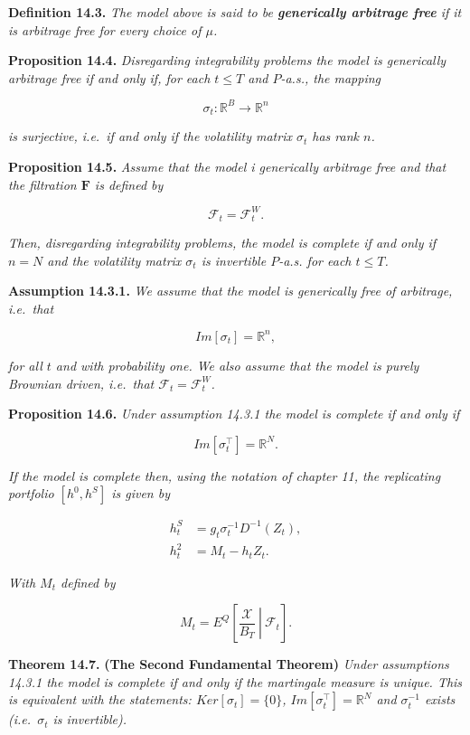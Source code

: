 \documentclass[
]{article}
\begin{document}
\textbf{Definition 14.3.} \emph{The model above is said to be
\textbf{generically arbitrage free} if it is arbitrage free for every
choice of \(\mu\).}

\textbf{Proposition 14.4.} \emph{Disregarding integrability problems the
model is generically arbitrage free if and only if, for each \(t\le T\)
and \(P\)-a.s., the mapping}

\[
\sigma_t : \mathbb{R}^B\to \mathbb{R}^n
\]

\emph{is surjective, i.e.~if and only if the volatility matrix
\(\sigma_t\) has rank \(n\).}

\textbf{Proposition 14.5.} \emph{Assume that the model i generically
arbitrage free and that the filtration \(\mathbf{F}\) is defined by}

\[
\mathcal{F}_t=\mathcal{F}^W_t.\tag{14.14}
\]

\emph{Then, disregarding integrability problems, the model is complete
if and only if \(n=N\) and the volatility matrix \(\sigma_t\) is
invertible \(P\)-a.s. for each \(t\le T\).}

\textbf{Assumption 14.3.1.} \emph{We assume that the model is
generically free of arbitrage, i.e.~that}

\[
Im[\sigma_t]=\mathbb{R}^n,\tag{14.16}
\]

\emph{for all \(t\) and with probability one. We also assume that the
model is purely Brownian driven, i.e.~that
\(\mathcal{F}_t=\mathcal{F}_t^W\).}

\textbf{Proposition 14.6.} \emph{Under assumption 14.3.1 the model is
complete if and only if}

\[
Im[\sigma_t^\top]=\mathbb{R}^N.\tag{14.23}
\]

\emph{If the model is complete then, using the notation of chapter 11,
the replicating portfolio \([h^0,h^S]\) is given by}

\begin{align*}
h_t^S&=g_t\sigma_t^{-1}D^{-1}(Z_t),\tag{14.24}\\
h_t^2&=M_t-h_tZ_t.\tag{14.25}
\end{align*}

\emph{With \(M_t\) defined by}

\[
M_t=E^Q\left[\left. \frac{\mathcal{X}}{B_T}\ \right\vert\ \mathcal{F}_t \right].\tag{14.17}
\]

\textbf{Theorem 14.7.} \textbf{(The Second Fundamental Theorem)}
\emph{Under assumptions 14.3.1 the model is complete if and only if the
martingale measure is unique. This is equivalent with the statements:
\(Ker[\sigma_t]=\{0\}\), \(Im[\sigma_t^\top]=\mathbb{R}^N\) and
\(\sigma_t^{-1}\) exists (i.e.~\(\sigma_t\) is invertible).}
\end{document}
